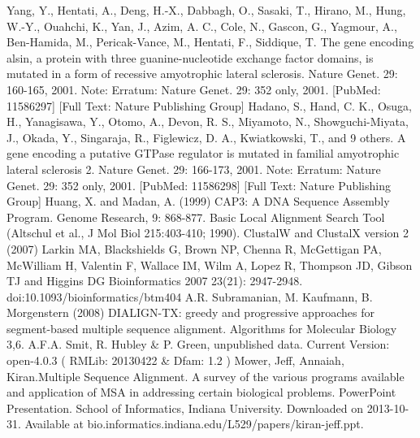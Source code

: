 \documentclass[11pt]{article} %
\begin{document}
\begin{thebibliography}{99}
  Yang, Y., Hentati, A., Deng, H.-X., Dabbagh, O., Sasaki, T., Hirano, M., Hung, W.-Y., Ouahchi, K., Yan, J., Azim, A. C., Cole, N.,
  Gascon, G., Yagmour, A., Ben-Hamida, M., Pericak-Vance, M., Hentati, F., Siddique, T. The gene encoding alsin, a protein with three
  guanine-nucleotide exchange factor domains, is mutated in a form of recessive amyotrophic lateral sclerosis. Nature Genet. 29: 160-165,
  2001. Note: Erratum: Nature Genet. 29: 352 only, 2001. [PubMed: 11586297] [Full Text: Nature Publishing Group]
  Hadano, S., Hand, C. K., Osuga, H., Yanagisawa, Y., Otomo, A., Devon, R. S., Miyamoto, N., Showguchi-Miyata, J., Okada, Y., Singaraja,
  R., Figlewicz, D. A., Kwiatkowski, T., and 9 others. A gene encoding a putative GTPase regulator is mutated in familial amyotrophic
  lateral sclerosis 2. Nature Genet. 29: 166-173, 2001. Note: Erratum: Nature Genet. 29: 352 only, 2001. [PubMed: 11586298] [Full Text:
  Nature Publishing Group]
  Huang, X. and Madan, A. (1999) CAP3: A DNA Sequence Assembly Program. Genome Research, 9: 868-877.
  Basic Local Alignment Search Tool (Altschul et al., J Mol Biol 215:403-410; 1990).
  ClustalW and ClustalX version 2 (2007) Larkin MA, Blackshields G, Brown NP, Chenna R, McGettigan PA, McWilliam H, Valentin F, 
  Wallace IM, Wilm A, Lopez R, Thompson JD, Gibson TJ and Higgins DG Bioinformatics 2007 23(21): 2947-2948.
  doi:10.1093/bioinformatics/btm404 
  A.R. Subramanian, M. Kaufmann, B. Morgenstern (2008)
  DIALIGN-TX: greedy and progressive approaches for segment-based multiple sequence alignment.
  Algorithms for Molecular Biology 3,6.
 A.F.A. Smit, R. Hubley \& P. Green, unpublished data. Current Version: open-4.0.3 ( RMLib: 20130422 \& Dfam: 1.2 )
  Mower, Jeff, Annaiah, Kiran.Multiple Sequence Alignment. A survey of the various programs available and application of MSA in
  addressing certain biological problems. PowerPoint Presentation. School of Informatics, Indiana University. Downloaded on
  2013-10-31. Available at bio.informatics.indiana.edu/L529/papers/kiran-jeff.ppt.
\end{thebibliography}
\end{document}
